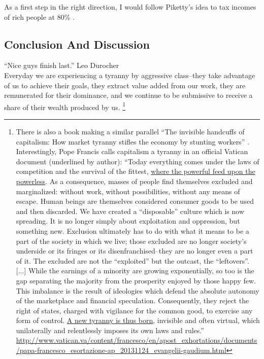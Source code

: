 \documentclass[11pt, letterpaper]{article}
\begin{document}
\begin{spacing}{2.0}
As a first step in the right direction, I would follow Piketty's idea to tax incomes of rich people at 80\% \citep{piketty14,piketty03,piketty95,saez06p,diamond11,piketty11}.

\subsection*{Conclusion And Discussion}

``Nice guys finish last.''  Leo Durocher \citep[cited in][]{judge12}\\

Everyday we are experiencing a tyranny by aggressive class--they take advantage
of us to achieve their goals, they extract value added from our work, they
are remunerated for their dominance, and we continue to
 be submissive
to receive a share of their wealth produced by us.  
\footnote{There is also a book making a similar parallel ``The invisible handcuffs of capitalism: How market tyranny stifles the economy by stunting workers'' \citep{perelman11}. Interestingly, Pope Francis calls capitalism a tyranny in an official
  Vatican document (underlined by author):
``Today everything comes under the laws of competition and the survival of the fittest, \underline{where the powerful feed upon the powerless}. As a consequence, masses of people find themselves excluded and marginalized: without work, without possibilities, without any means of escape.
%
Human beings are themselves considered consumer goods to be used and then
discarded. We have created a ``disposable'' culture which is now spreading. It is
no longer simply about exploitation and oppression, but something new. Exclusion
ultimately has to do with what it means to be a part of the society in which we
live; those excluded are no longer society's underside or its fringes or its
disenfranchised--they are no longer even a part of it. The excluded are not the
``exploited'' but the outcast, the ``leftovers''. [...]
%
 While the earnings of a minority are growing exponentially, so too is the gap
 separating the majority from the prosperity enjoyed by those happy few. This
 imbalance is the result of ideologies which defend the absolute autonomy of the
 marketplace and financial speculation. Consequently, they reject the right of
 states, charged with vigilance for the common good, to exercise any form of
 control. \underline{A new tyranny is thus born}, invisible and often virtual,
 which unilaterally and relentlessly imposes its own laws and rules.''
 \url{http://www.vatican.va/content/francesco/en/apost_exhortations/documents/papa-francesco_esortazione-ap_20131124_evangelii-gaudium.html} %
}




\end{spacing}
\end{document}
